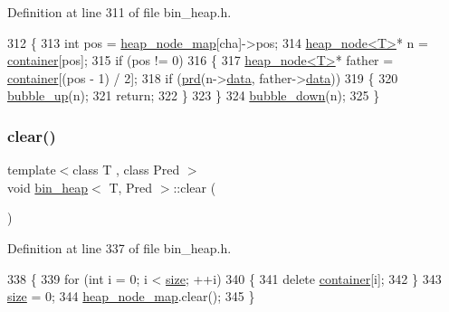 Definition at line 311 of file bin\+\_\+heap.\+h.


\begin{DoxyCode}
312 \{
313     \textcolor{keywordtype}{int} pos = \mbox{\hyperlink{classbin__heap_ab646175f97b352ca26587d23bf57c79f}{heap\_node\_map}}[cha]->pos;
314     \mbox{\hyperlink{classheap__node}{heap\_node<T>}}* n = \mbox{\hyperlink{classbin__heap_a413200f4c6e24090c5e9a32184fc8857}{container}}[pos];
315     \textcolor{keywordflow}{if} (pos != 0)
316     \{
317     \mbox{\hyperlink{classheap__node}{heap\_node<T>}}* father = \mbox{\hyperlink{classbin__heap_a413200f4c6e24090c5e9a32184fc8857}{container}}[(pos - 1) / 2];
318     \textcolor{keywordflow}{if} (\mbox{\hyperlink{classbin__heap_a5ecc420dfd03a6a0b4c9328cac1fae14}{prd}}(n->\mbox{\hyperlink{classheap__node_ae37815e49df4d367e28ca4615b40e397}{data}}, father->\mbox{\hyperlink{classheap__node_ae37815e49df4d367e28ca4615b40e397}{data}}))
319     \{
320         \mbox{\hyperlink{classbin__heap_aefc41dde4f1decfe523d23eb3d5e885f}{bubble\_up}}(n);
321         \textcolor{keywordflow}{return};
322     \}
323     \}
324     \mbox{\hyperlink{classbin__heap_a6c16b71925f4df063778aadc527a6fc6}{bubble\_down}}(n);
325 \}
\end{DoxyCode}
\mbox{\label{classbin__heap_abf7a6189fcb48e435fc156f764e38f1d}} 
\subsubsection{\texorpdfstring{clear()}{clear()}}
{\footnotesize\ttfamily template$<$class T , class Pred $>$ \\
void \mbox{\hyperlink{classbin__heap}{bin\+\_\+heap}}$<$ T, Pred $>$\+::clear (\begin{DoxyParamCaption}{ }\end{DoxyParamCaption})}



Definition at line 337 of file bin\+\_\+heap.\+h.


\begin{DoxyCode}
338 \{
339     \textcolor{keywordflow}{for} (\textcolor{keywordtype}{int} i = 0; i < \mbox{\hyperlink{classbin__heap_a8dde1008dcc24d734dbdb2c7ca50435b}{size}}; ++i)
340     \{
341     \textcolor{keyword}{delete} \mbox{\hyperlink{classbin__heap_a413200f4c6e24090c5e9a32184fc8857}{container}}[i];
342     \}
343     \mbox{\hyperlink{classbin__heap_a8dde1008dcc24d734dbdb2c7ca50435b}{size}} = 0;
344     \mbox{\hyperlink{classbin__heap_ab646175f97b352ca26587d23bf57c79f}{heap\_node\_map}}.clear();
345 \}
\end{DoxyCode}
\mbox{\label{classbin__heap_a2bbb9cf5cc5cda265c8603c561b796a5}} 
